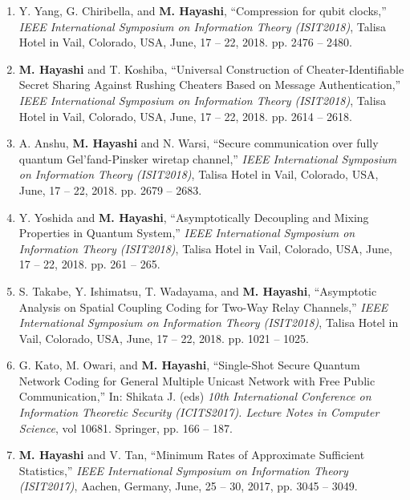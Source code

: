\documentclass[a4paper,12pt,oneside]{article}
\begin{document}
\begin{enumerate}
    \item
    Y. Yang, G. Chiribella, and \textbf{M. Hayashi},
    ``Compression for qubit clocks,''
    {\em IEEE International Symposium on Information Theory (ISIT2018)}, 
    Talisa Hotel in Vail, Colorado, USA, June, 17 -- 22, 2018.
    pp. 2476 -- 2480.
    
    \item
     \textbf{M. Hayashi} and T. Koshiba,
    ``Universal Construction of Cheater-Identifiable Secret Sharing Against Rushing Cheaters Based on Message Authentication,''
    {\em IEEE International Symposium on Information Theory (ISIT2018)}, 
     Talisa Hotel in Vail, Colorado, USA, June, 17 -- 22, 2018.
    pp. 2614 -- 2618.
    
    \item
    A. Anshu, \textbf{M. Hayashi} and N. Warsi,
    ``Secure communication over fully quantum Gel'fand-Pinsker wiretap channel,''
    {\em IEEE International Symposium on Information Theory (ISIT2018)}, 
     Talisa Hotel in Vail, Colorado, USA, June, 17 -- 22, 2018.
    pp. 2679 -- 2683. 
    
    \item
    Y. Yoshida and \textbf{M. Hayashi},
    ``Asymptotically Decoupling and Mixing Properties in Quantum System,''
    {\em IEEE International Symposium on Information Theory (ISIT2018)}, 
     Talisa Hotel in Vail, Colorado, USA, June, 17 -- 22, 2018.
    pp. 261 -- 265.
     
    \item
    S. Takabe,
    Y. Ishimatsu,
    T. Wadayama, and \textbf{M. Hayashi},
    ``Asymptotic Analysis on Spatial Coupling Coding for Two-Way Relay Channels,''
    {\em IEEE International Symposium on Information Theory (ISIT2018)}, 
     Talisa Hotel in Vail, Colorado, USA, June, 17 -- 22, 2018.
    pp. 1021 -- 1025.
    
    
    \item
    G. Kato, M. Owari, and \textbf{M. Hayashi},
    ``Single-Shot Secure Quantum Network Coding
    for General Multiple Unicast Network with Free
    Public Communication,''
    In: Shikata J. (eds) 
    {\em 10th International Conference on Information Theoretic Security (ICITS2017). 
    Lecture Notes in Computer Science},
     vol 10681. Springer,  pp. 166 -- 187.
    
    \item
    \textbf{M. Hayashi} and V. Tan,
    ``Minimum Rates of Approximate Sufficient Statistics,''
    {\em IEEE International Symposium on Information Theory (ISIT2017)}, 
    Aachen, Germany, June, 25 -- 30, 2017, pp. 3045 -- 3049.
    

\end{enumerate}
\end{document}
